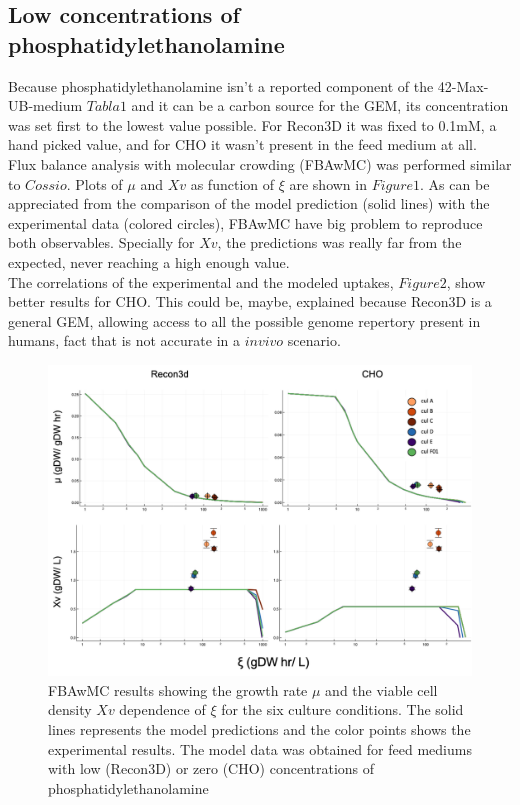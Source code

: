 \documentclass[]{article}
\begin{document}
\subsection{Low concentrations of phosphatidylethanolamine} %

		Because phosphatidylethanolamine isn't a reported component of the 42-Max-UB-medium $Tabla 1$ and it can be a carbon source for the GEM, its concentration was set first to the lowest value possible. For Recon3D it was fixed to 0.1mM, a hand picked value, and for CHO it wasn't present in the feed medium at all.\\ 
		Flux balance analysis with molecular crowding (FBAwMC) was performed similar to $Cossio$. Plots of $\mu$ and $Xv$ as function of $\xi$ are shown in $Figure1$. As can be appreciated from the comparison of the model prediction (solid lines) with the  experimental data (colored circles), FBAwMC have big problem to reproduce both observables. Specially for $Xv$, the predictions was really far from the expected, never reaching a high enough value.\\
		The correlations of the experimental and the modeled uptakes, $Figure 2$, show better results for CHO. This could be, maybe, explained because Recon3D is a general GEM, allowing access to all the possible genome repertory present in humans, fact that is not accurate in a $in vivo$ scenario.
		
	\begin{figure}[h]
		\includegraphics[scale = 0.5]{low_medium_1}
		\caption{FBAwMC results showing the growth rate $\mu$ and the viable cell density $Xv$ dependence of $\xi$ for the six culture conditions. The solid lines represents the model predictions and the color points shows the experimental results. The model data was obtained for feed mediums with low (Recon3D) or zero (CHO) concentrations of phosphatidylethanolamine}
		
	\end{figure}
	
\end{document}
